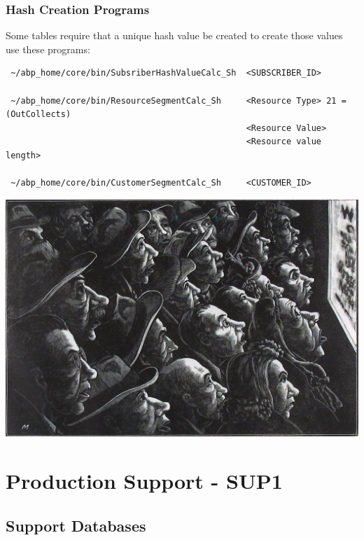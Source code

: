\documentclass[12pt,twoside]{article}
\begin{document}
   \normalsize
\subsubsection{Hash Creation Programs}
\label{sec-9-16-3}

   Some tables require that a unique hash value be created to create those values use these programs:
\begin{verbatim}
 ~/abp_home/core/bin/SubsriberHashValueCalc_Sh  <SUBSCRIBER_ID>

 ~/abp_home/core/bin/ResourceSegmentCalc_Sh     <Resource Type> 21 = (OutCollects)
                                                <Resource Value> 
                                                <Resource value length>

 ~/abp_home/core/bin/CustomerSegmentCalc_Sh     <CUSTOMER_ID>
\end{verbatim}


\normalsize
\vspace{45mm}
    \includegraphics[width=17cm]{Pictures/Meissner_War_Bulletins.jpg}
\newpage
\section{Production Support - SUP1}
\label{sec-10}
\subsection{Support Databases}
\label{sec-10-1}

\scriptsize
\end{document}
